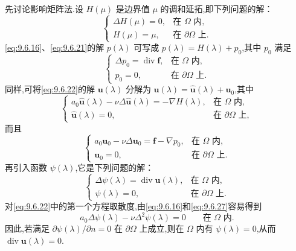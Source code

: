 先讨论影响矩阵法.设 \(H(\mu)\) 是边界值 \(\mu\) 的调和延拓,即下列问题的解：
\begin{equation}\label{eq:9.6.23}
  \begin{cases}
    \Delta H(\mu)=0,&\text{在 }\Omega\text{ 内},\\
    H(\mu)=\mu,&\text{在 }\partial\Omega\text{ 上}.
  \end{cases}
\end{equation}
\eqref{eq:9.6.16}、\eqref{eq:9.6.21}的解 \(p(\lambda)\) 可写成 \(p(\lambda)=H(\lambda)+p_0\),其中 \(p_0\) 满足
\begin{equation}\label{eq:9.6.24}
  \begin{cases}
    \Delta p_0=\operatorname{div}\boldsymbol{f},&\text{在 }\Omega\text{ 内},\\
    p_0=0,&\text{在 }\partial\Omega\text{ 上}.
  \end{cases}
\end{equation}
同样,可将\eqref{eq:9.6.22}的解 \(\boldsymbol{u}(\lambda)\) 分解为 \(\boldsymbol{u}(\lambda)=\widehat{\boldsymbol{u}}(\lambda)+\boldsymbol{u}_0\),其中
\begin{equation}\label{eq:9.6.25}
  \begin{cases}
    a_0\widehat{\boldsymbol{u}}(\lambda)-\nu\Delta\widehat{\boldsymbol{u}}(\lambda)
         =-\nabla H(\lambda),&\text{在 }\Omega\text{ 内},\\
    \widehat{\boldsymbol{u}}(\lambda)=0,&\text{在 }\partial\Omega\text{ 上},
  \end{cases}
\end{equation}
而且
\begin{equation}\label{eq:9.6.26}
  \begin{cases}
    a_0\boldsymbol{u}_0-\nu\Delta\boldsymbol{u}_0=\boldsymbol{f}-\nabla p_0,&\text{在 }\Omega\text{ 内},\\
    \boldsymbol{u}_0=0,&\text{在 }\partial\Omega\text{ 上}.
  \end{cases}
\end{equation}
再引入函数 \(\psi(\lambda)\),它是下列问题的解：
\begin{equation}\label{eq:9.6.27}
  \begin{cases}
    \Delta\psi(\lambda)=\operatorname{div}\boldsymbol{u}(\lambda),
         &\text{在 }\Omega\text{ 内},\\
    \psi(\lambda)=0,&\text{在 }\partial\Omega\text{ 上}.
  \end{cases}
\end{equation}
对\eqref{eq:9.6.22}中的第一个方程取散度,由\eqref{eq:9.6.16}和\eqref{eq:9.6.27}容易得到
\[
  a_0\Delta\psi(\lambda)-\nu\Delta^2\psi(\lambda)=0\qquad\text{在 }\Omega\text{ 内}.
\]
因此,若满足 \(\partial\psi(\lambda)/\partial n=0\) 在 \(\partial\Omega\) 上成立,则在 \(\Omega\) 内有 \(\psi(\lambda)=0\),从而 \(\operatorname{div}\boldsymbol{u}(\lambda)=0\).

